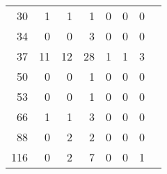 \documentclass[12pt, oneside]{article}   	%
\begin{document}
\begin{table}[ht]
\begin{tabular}{rrrrrrrr}
30 & 1 &   1 &   1 &   0 &   0 &   0 \\ 
34 & 0 &   0 &   3 &   0 &   0 &   0 \\ 
37 & 11 &  12 &  28 &   1 &   1 &   3 \\ 
50 & 0 &   0 &   1 &   0 &   0 &   0 \\ 
53 & 0 &   0 &   1 &   0 &   0 &   0 \\ 
66 & 1 &   1 &   3 &   0 &   0 &   0 \\ 
88 & 0 &   2 &   2 &   0 &   0 &   0 \\ 
116 & 0 &  2 &   7 &   0 &   0 &   1 \\ 
   \hline
\end{tabular}
\end{table}




\end{document}
